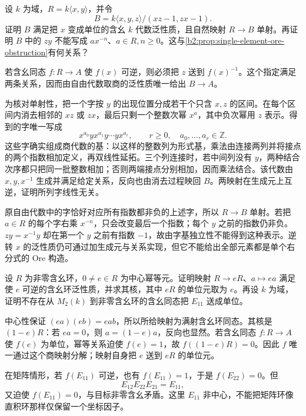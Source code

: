 \begin{optionalexercise}\label{b2:ex:19-one-denominator-failure}
	设 \(k\) 为域，\(R=k\langle x,y\rangle\)，并令
	\[
		B=k\langle x,y,z\rangle/(xz-1,zx-1).
	\]
	证明 \(B\) 满足把 \(x\) 变成单位的含幺 \(k\) 代数泛性质，且自然映射 \(R\to B\) 单射。再证明 \(B\) 中的 \(zy\) 不能写成 \(ax^{-n}\)、\(a\in R,n\ge0\)。这与\cref{b2:prop:single-element-ore-obstruction}有何关系？
\end{optionalexercise}
\begin{solution}
	若含幺同态 \(f:R\to A\) 使 \(f(x)\) 可逆，则必须把 \(z\) 送到 \(f(x)^{-1}\)。这个指定满足两条关系，因而由自由代数取商的泛性质唯一给出 \(B\to A\)。

	为核对单射性，把一个字按 \(y\) 的出现位置分成若干个只含 \(x,z\) 的区间。在每个区间内消去相邻的 \(xz\) 或 \(zx\)，最后只剩一个整数次幂 \(x^a\)，其中负次幂用 \(z\) 表示。得到的字唯一写成
	\[
		x^{a_0}yx^{a_1}y\cdots yx^{a_r},\qquad r\ge0,\quad a_0,\ldots,a_r\in\mathbb Z.
	\]
	这些字确实组成商代数的基：以这样的整数列为形式基，乘法由连接两列并将接点的两个指数相加定义，再双线性延拓。三个列连接时，若中间列没有 \(y\)，两种结合次序都只把同一批整数相加；否则两端接点分别相加，因而乘法结合。该代数由 \(x,y,x^{-1}\) 生成并满足给定关系，反向也由消去过程映回 \(B\)。两映射在生成元上互逆，证明所列字线性无关。

	原自由代数中的字恰好对应所有指数都非负的上述字，所以 \(R\to B\) 单射。若把 \(a\in R\) 的每个字右乘 \(x^{-n}\)，只会改变最后一个指数；每个 \(y\) 之前的指数仍非负。\(zy=x^{-1}y\) 却在第一个 \(y\) 之前有指数 \(-1\)，故由字基独立性不能得到这种表示。逆转 \(x\) 的泛性质仍可通过加生成元与关系实现，但它不能给出全部元素都是单个右分式的 Ore 构造。
\end{solution}

\begin{optionalexercise}\label{b2:ex:19-zero-divisor-localization}
	设 \(R\) 为非零含幺环，\(0\ne e\in R\) 为中心幂等元。证明映射 \(R\to eR\)、\(a\mapsto ea\) 满足使 \(e\) 可逆的含幺环泛性质，并求其核，其中 \(eR\) 的单位元取为 \(e\)。再设 \(k\) 为域，证明不存在从 \(M_2(k)\) 到非零含幺环的含幺同态把 \(E_{11}\) 送成单位。
\end{optionalexercise}
\begin{solution}
	中心性保证 \((ea)(eb)=eab\)，所以所给映射为满射含幺环同态。其核是 \((1-e)R\)：若 \(ea=0\)，则 \(a=(1-e)a\)，反向也显然。若含幺同态 \(f:R\to A\) 使 \(f(e)\) 为单位，幂等关系迫使 \(f(e)=1\)，故 \(f((1-e)R)=0\)。因此 \(f\) 唯一通过这个商映射分解；映射自身把 \(e\) 送到 \(eR\) 的单位元。

	在矩阵情形，若 \(f(E_{11})\) 可逆，也有 \(f(E_{11})=1\)，于是 \(f(E_{22})=0\)。但
	\[
		E_{12}E_{22}E_{21}=E_{11},
	\]
	又迫使 \(f(E_{11})=0\)，与目标非零含幺矛盾。这里 \(E_{11}\) 非中心，不能把矩阵环像直积环那样仅保留一个坐标因子。
\end{solution}


